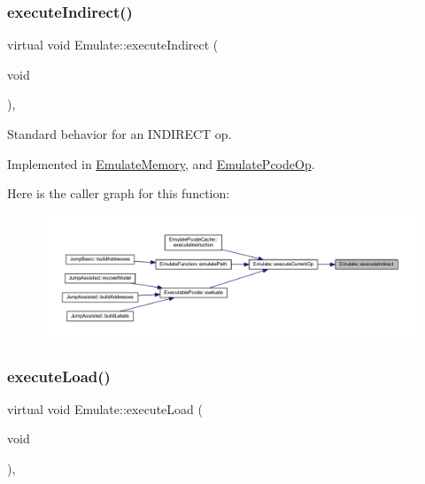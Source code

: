 \subsubsection{\texorpdfstring{executeIndirect()}{executeIndirect()}}
{\footnotesize\ttfamily virtual void Emulate\+::execute\+Indirect (\begin{DoxyParamCaption}\item[{void}]{ }\end{DoxyParamCaption})\hspace{0.3cm}{\ttfamily [protected]}, {}}



Standard behavior for an I\+N\+D\+I\+R\+E\+CT op. 



Implemented in \mbox{\hyperlink{class_emulate_memory_a10021d3e2d5ea193a3dd6f372077c3ce}{Emulate\+Memory}}, and \mbox{\hyperlink{class_emulate_pcode_op_ab092522c4b63f02b633dbeb98d9ecaba}{Emulate\+Pcode\+Op}}.

Here is the caller graph for this function\+:
\nopagebreak
\begin{figure}[H]
\begin{center}
\leavevmode
\includegraphics[width=350pt]{class_emulate_aa791523787e5154d73bfe0e846a2cd38_icgraph}
\end{center}
\end{figure}
\mbox{\label{class_emulate_acc9c4d2ddbfe4ff639e320d30a212e56}} 
\subsubsection{\texorpdfstring{executeLoad()}{executeLoad()}}
{\footnotesize\ttfamily virtual void Emulate\+::execute\+Load (\begin{DoxyParamCaption}\item[{void}]{ }\end{DoxyParamCaption})\hspace{0.3cm}{\ttfamily [protected]}, {}}



